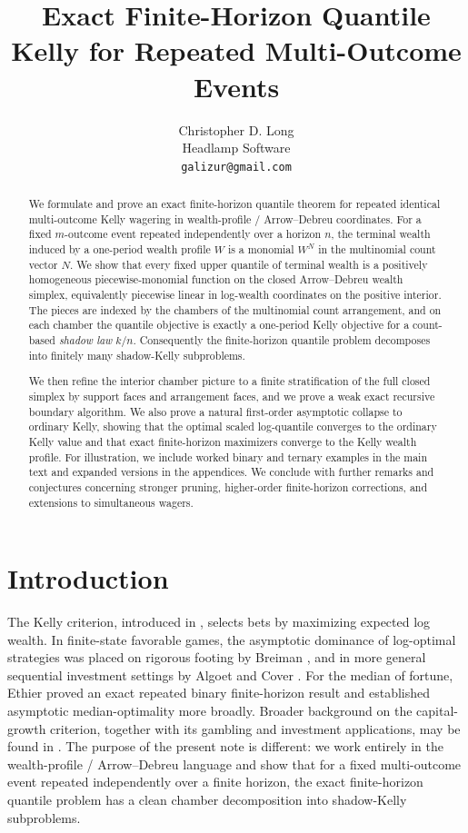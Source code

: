 \documentclass[11pt]{article}
\title{Exact Finite-Horizon Quantile Kelly for Repeated Multi-Outcome Events}
\author{Christopher D. Long\\Headlamp Software\\\texttt{galizur@gmail.com}}
\date{}
\theoremstyle{definition}
\newcommand{\1}{\mathbf{1}}
\begin{document}
\maketitle

\begin{abstract}
We formulate and prove an exact finite-horizon quantile theorem for repeated identical multi-outcome Kelly wagering in wealth-profile / Arrow--Debreu coordinates. For a fixed $m$-outcome event repeated independently over a horizon $n$, the terminal wealth induced by a one-period wealth profile $W$ is a monomial $W^N$ in the multinomial count vector $N$. We show that every fixed upper quantile of terminal wealth is a positively homogeneous piecewise-monomial function on the closed Arrow--Debreu wealth simplex, equivalently piecewise linear in log-wealth coordinates on the positive interior. The pieces are indexed by the chambers of the multinomial count arrangement, and on each chamber the quantile objective is exactly a one-period Kelly objective for a count-based \emph{shadow law} $k/n$. Consequently the finite-horizon quantile problem decomposes into finitely many shadow-Kelly subproblems.

We then refine the interior chamber picture to a finite stratification of the full closed simplex by support faces and arrangement faces, and we prove a weak exact recursive boundary algorithm. We also prove a natural first-order asymptotic collapse to ordinary Kelly, showing that the optimal scaled log-quantile converges to the ordinary Kelly value and that exact finite-horizon maximizers converge to the Kelly wealth profile. For illustration, we include worked binary and ternary examples in the main text and expanded versions in the appendices. We conclude with further remarks and conjectures concerning stronger pruning, higher-order finite-horizon corrections, and extensions to simultaneous wagers.
\end{abstract}

\section{Introduction}

The Kelly criterion, introduced in \cite{Kelly1956}, selects bets by maximizing expected log wealth. In finite-state favorable games, the asymptotic dominance of log-optimal strategies was placed on rigorous footing by Breiman \cite{Breiman1961}, and in more general sequential investment settings by Algoet and Cover \cite{AlgoetCover1988}. For the median of fortune, Ethier \cite{Ethier2004} proved an exact repeated binary finite-horizon result and established asymptotic median-optimality more broadly. Broader background on the capital-growth criterion, together with its gambling and investment applications, may be found in \cite{MacLeanThorpZiemba2011,Thorp2008}. The purpose of the present note is different: we work entirely in the wealth-profile / Arrow--Debreu language and show that for a fixed multi-outcome event repeated independently over a finite horizon, the exact finite-horizon quantile problem has a clean chamber decomposition into shadow-Kelly subproblems.
\end{document}
